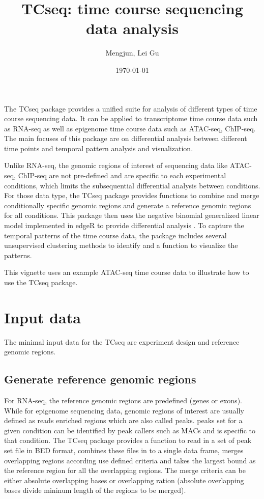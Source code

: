 \documentclass[a4paper]{article}
\title{TCseq: time course sequencing data analysis}
\author{Mengjun, Lei Gu}
\date{ \today }
\begin{document}
\maketitle

The TCseq package provides a unified suite for analysis of different types of time course sequencing data. It can be applied to transcriptome time course data such as RNA-seq as well as epigenome time course data such as ATAC-seq, ChIP-seq. The main focuses of this package are on differential analysis between different time points and temporal pattern analysis and visualization.

Unlike RNA-seq,  the genomic regions of interest of sequencing data like ATAC-seq, ChIP-seq are not pre-defined and are specific to each experimental conditions, which limits the subsequential differential analysis between conditions. For those data type, the TCseq package provides functions to combine and merge conditionally specific genomic regions and generate a reference genomic regions for all conditions. This package then uses the negative binomial generalized linear model implemented in edgeR to provide differential analysis \cite{Robinson}. To capture the temporal patterns of the time course data, the package includes several unsupervised clustering methods to identify and a function to visualize the patterns.

This vignette uses an example ATAC-seq time course data to illustrate how to use the TCseq package.

\section{Input data}
The minimal input data for the TCseq are experiment design and reference genomic regions.

\subsection{Generate reference genomic regions}
For RNA-seq, the reference genomic regions are predefined (genes or exons). While for epigenome sequencing data, genomic regions of interest are usually defined as reads enriched regions which are also called peaks. peaks set for a given condition can be identified by peak callers such as MACs and is specific to that condition. The TCseq package provides a function to read in a set of peak set file in BED format, combines these files in to a single data frame, merges overlapping regions according use defined criteria and takes the largest bound as the reference region for all the overlapping regions. The merge criteria can be either absolute overlapping bases or overlapping ration (absolute overlapping bases divide mininum length of the regions to be merged).
\end{document}
